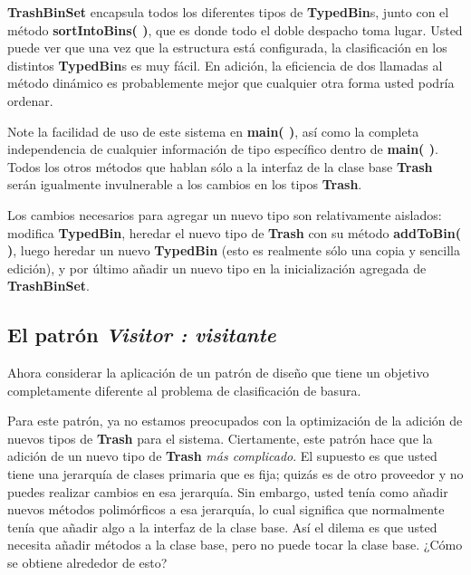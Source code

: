 \documentclass{article}
\begin{document}
\textbf{TrashBinSet} encapsula todos los diferentes tipos de \textbf{ TypedBin}s, junto con el método \textbf{sortIntoBins( )}, que es donde todo el doble
despacho toma lugar. Usted puede ver que una vez que la estructura está configurada, la clasificación en los distintos \textbf{TypedBin}s es muy fácil. En adición, la eficiencia de dos llamadas al método dinámico es probablemente mejor que cualquier otra forma usted podría ordenar. \newline

Note la facilidad de uso de este sistema en \textbf{main( )}, así como la completa independencia de cualquier información de tipo específico dentro de \textbf{main( )}. Todos los otros métodos que hablan sólo a la interfaz de la clase base \textbf{Trash} serán igualmente invulnerable a los cambios en los tipos \textbf{Trash}.         \newline

Los cambios necesarios  para agregar un nuevo tipo son relativamente aislados: modifica \textbf{TypedBin}, heredar el nuevo tipo de \textbf{Trash} con su método \textbf{addToBin( )}, luego heredar un nuevo \textbf{TypedBin} (esto es realmente sólo una copia y sencilla edición), y por último añadir un nuevo tipo en la inicialización agregada de \textbf{TrashBinSet}.  \newline

\subsection{El patrón \textit{Visitor : visitante}}

Ahora considerar la aplicación de un patrón de diseño que tiene un objetivo completamente diferente al problema de clasificación de basura. \newline

Para este patrón, ya no estamos preocupados con la optimización de la adición de nuevos tipos de \textbf{Trash} para el sistema. Ciertamente, este patrón hace que la adición de un nuevo tipo de \textbf{Trash} \textit{más complicado}. El supuesto es que usted tiene una jerarquía de clases primaria que es fija; quizás es de otro proveedor y no puedes realizar cambios en esa jerarquía. Sin embargo, usted tenía como añadir nuevos métodos polimórficos a esa jerarquía, lo cual significa que normalmente tenía que añadir algo a la interfaz de la clase base. Así el dilema es que usted necesita añadir métodos a la clase base, pero no puede tocar la clase base. ¿Cómo se obtiene alrededor de esto?  \newline
\end{document}
